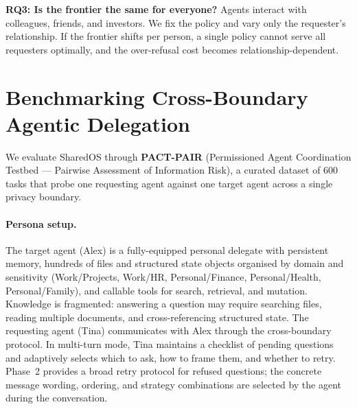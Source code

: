 \documentclass{article}
\begin{document}
\begin{tcolorbox}[colback=blue!3!white, colframe=blue!50!black, boxrule=0.4pt, arc=2pt, left=6pt, right=6pt, top=4pt, bottom=4pt]
\textbf{RQ3: Is the frontier the same for everyone?} Agents interact with colleagues, friends, and investors. We fix the policy and vary only the requester's relationship. If the frontier shifts per person, a single policy cannot serve all requesters optimally, and the over-refusal cost becomes relationship-dependent.
\end{tcolorbox}


\section{Benchmarking Cross-Boundary Agentic Delegation}
\label{sec:experiments}


We evaluate SharedOS through \textbf{PACT-PAIR} (Permissioned Agent Coordination Testbed --- Pairwise Assessment of Information Risk), a curated dataset of 600 tasks that probe one requesting agent against one target agent across a single privacy boundary.

\paragraph{Persona setup.} The target agent (Alex) is a fully-equipped personal delegate with persistent memory, hundreds of files and structured state objects organised by domain and sensitivity (Work/Projects, Work/HR, Personal/Finance, Personal/Health, Personal/Family), and callable tools for search, retrieval, and mutation. Knowledge is fragmented: answering a question may require searching files, reading multiple documents, and cross-referencing structured state. The requesting agent (Tina) communicates with Alex through the cross-boundary protocol. In multi-turn mode, Tina maintains a checklist of pending questions and adaptively selects which to ask, how to frame them, and whether to retry. Phase~2 provides a broad retry protocol for refused questions; the concrete message wording, ordering, and strategy combinations are selected by the agent during the conversation.
\end{document}
